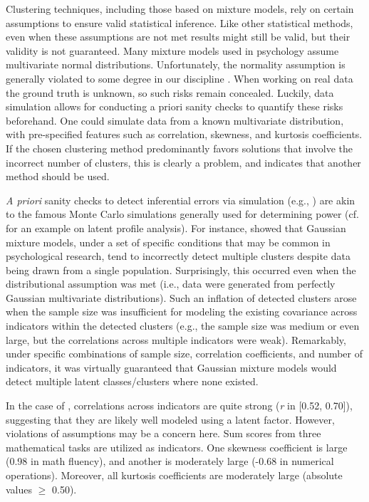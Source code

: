 \documentclass[letterpaper,11pt]{article}
\begin{document}
Clustering techniques, including those based on mixture models, rely on certain assumptions to ensure valid statistical inference. Like other statistical methods, even when these assumptions are not met results might still be valid, but their validity is not guaranteed. Many mixture models used in psychology assume multivariate normal distributions. Unfortunately, the normality assumption is generally violated to some degree in our discipline \cite{micceri1989unicorn}. When working on real data the ground truth is unknown, so such risks remain concealed. Luckily, data simulation allows for conducting a priori sanity checks to quantify these risks beforehand. One could simulate data from a known multivariate distribution, with pre-specified features such as correlation, skewness, and kurtosis coefficients. If the chosen clustering method predominantly favors solutions that involve the incorrect number of clusters, this is clearly a problem, and indicates that another method should be used.

\textit{A priori} sanity checks to detect inferential errors via simulation (e.g., ) are akin to the famous Monte Carlo simulations generally used for determining power (cf.  for an example on latent profile analysis). For instance,  showed that Gaussian mixture models, under a set of specific conditions that may be common in psychological research, tend to incorrectly detect multiple clusters despite data being drawn from a single population. Surprisingly, this occurred even when the distributional assumption was met (i.e., data were generated from perfectly Gaussian multivariate distributions). Such an inflation of detected clusters arose when the sample size was insufficient for modeling the existing covariance across indicators within the detected clusters (e.g., the sample size was medium or even large, but the correlations across multiple indicators were weak). Remarkably, under specific combinations of sample size, correlation coefficients, and number of indicators, it was virtually guaranteed that Gaussian mixture models would detect multiple latent classes/clusters where none existed.

In the case of , correlations across indicators are quite strong (\textit{r} in [0.52, 0.70]), suggesting that they are likely well modeled using a latent factor. However, violations of assumptions may be a concern here. Sum scores from three mathematical tasks are utilized as indicators. One skewness coefficient is large (0.98 in math fluency), and another is moderately large (-0.68 in numerical operations). Moreover, all kurtosis coefficients are moderately large (absolute values $\geq$ 0.50). 
\end{document}
